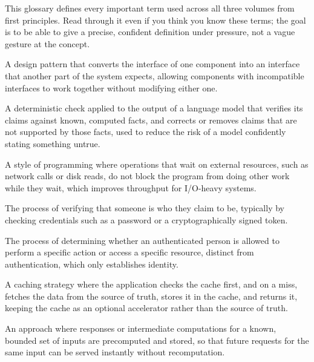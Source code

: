 \documentclass[11pt,a4paper]{report}
\begin{document}
This glossary defines every important term used across all three volumes from first principles. Read through it even if you think you know these terms; the goal is to be able to give a precise, confident definition under pressure, not a vague gesture at the concept.

\begin{description}[leftmargin=*,style=nextline]
\item[Adapter Pattern] A design pattern that converts the interface of one component into an interface that another part of the system expects, allowing components with incompatible interfaces to work together without modifying either one.

\item[Anti-Hallucination Guard] A deterministic check applied to the output of a language model that verifies its claims against known, computed facts, and corrects or removes claims that are not supported by those facts, used to reduce the risk of a model confidently stating something untrue.

\item[Asynchronous Programming] A style of programming where operations that wait on external resources, such as network calls or disk reads, do not block the program from doing other work while they wait, which improves throughput for I/O-heavy systems.

\item[Authentication] The process of verifying that someone is who they claim to be, typically by checking credentials such as a password or a cryptographically signed token.

\item[Authorization] The process of determining whether an authenticated person is allowed to perform a specific action or access a specific resource, distinct from authentication, which only establishes identity.

\item[Cache-Aside Pattern] A caching strategy where the application checks the cache first, and on a miss, fetches the data from the source of truth, stores it in the cache, and returns it, keeping the cache as an optional accelerator rather than the source of truth.

\item[Cache Augmented Generation (CAG)] An approach where responses or intermediate computations for a known, bounded set of inputs are precomputed and stored, so that future requests for the same input can be served instantly without recomputation.


\end{description}
\end{document}
